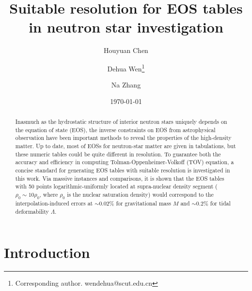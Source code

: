 \documentclass[preprint,tightenlines,eqsecnum,floats,aps,amsmath,amssymb,nofootinbib,prd,showpacs]{revtex4}
\begin{document}

\title{Suitable resolution for EOS tables in neutron star investigation}

\author{Houyuan Chen}

\author{Dehua Wen\footnote{Corresponding author. wendehua@scut.edu.cn}}

\author{Na Zhang}







\date{\today}


\begin{abstract}
Inasmuch as the hydrostatic structure of interior neutron stars uniquely depends on the equation of state (EOS), the inverse constraints on EOS from astrophysical observation have been important methods to reveal the properties of the high-density matter. Up to date, most of EOSs for neutron-star matter are given in tabulations, but these numeric tables could be quite different in resolution. To guarantee both the accuracy and efficiency in computing Tolman-Oppenheimer-Volkoff (TOV) equation, a concise standard for generating EOS tables with suitable resolution is investigated in this work. Via massive instances and comparisons, it is shown that the EOS tables with 50 points logarithmic-uniformly located at supra-nuclear density segment ( $\rho_{0} \sim 10 \rho_{0} $, where $\rho_{0}$ is the nuclear saturation density) would correspond to the interpolation-induced errors at $\sim 0.02\%$ for gravitational mass $M$ and $\sim 0.2\%$ for tidal deformability $\Lambda$.

\end{abstract}



\maketitle


\section{Introduction}
\end{document}
